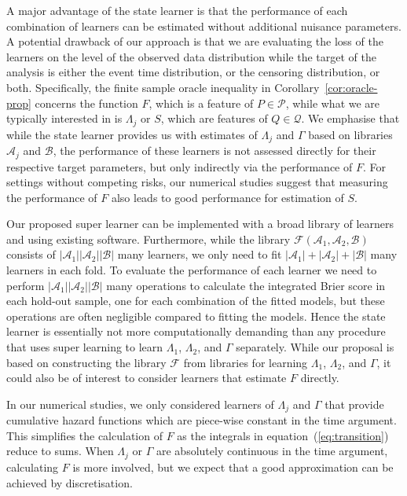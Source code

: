 \documentclass[11pt]{article}
\theoremstyle{thmstyleone}%
\theoremstyle{thmstyletwo}%
\theoremstyle{thmstylethree}%
\newcommand{\1}{\mathds{1}}
\begin{document}
A major advantage of the state learner is that the performance of each
combination of learners can be estimated without additional nuisance
parameters. A potential drawback of our approach is that we are
evaluating the loss of the learners on the level of the observed data
distribution while the target of the analysis is either the event time
distribution, or the censoring distribution, or both.
Specifically, the finite sample oracle inequality in
Corollary~\ref{cor:oracle-prop} concerns the function \( F \), which
is a feature of \( P \in \mathcal{P} \), while what we are typically
interested in is \( \Lambda_j \) or \( S \), which are features of
\( Q \in \mathcal{Q} \). We emphasise that while the state learner
provides us with estimates of \( \Lambda_j \) and $\Gamma$ based on
libraries \( \mathcal{A}_j \) and \( \mathcal{B} \), the performance
of these learners is not assessed directly for their respective target
parameters, but only indirectly via the performance of \( F \).  For
settings without competing risks, our numerical studies suggest that
measuring the performance of \( F \) also leads to good performance
for estimation of \( S \).

Our proposed super learner can be implemented with a broad library of learners
and using existing software.
Furthermore, while
the library \( \mathcal{F}(\mathcal{A}_1,\mathcal{A}_2,\mathcal{B}) \) consists
of \( |\mathcal{A}_1||\mathcal{A}_2||\mathcal{B}| \) many learners, we only need to fit
\( |\mathcal{A}_1| +|\mathcal{A}_2| + |\mathcal{B}| \) many learners in each fold. To
evaluate the performance of each learner we need to perform
\( |\mathcal{A}_1||\mathcal{A}_2||\mathcal{B}| \) many operations to calculate the
integrated Brier score in each hold-out sample, one for each combination of the
fitted models, but these operations are often negligible compared to fitting the
models. Hence the state learner is essentially not more computationally demanding
than any procedure that uses super learning to learn $\Lambda_1$, $\Lambda_2$,
and $\Gamma$ separately. While our proposal is based on constructing the library
\( \mathcal{F} \) from libraries for learning \( \Lambda_1 \), $\Lambda_2$, and
$\Gamma$, it could also be of interest to consider learners that estimate
\( F \) directly.

In our numerical studies, we only considered learners of $\Lambda_j$ and
$\Gamma$ that provide cumulative hazard functions which are piece-wise constant
in the time argument. This simplifies the calculation of \( F \) as the
integrals in equation~(\ref{eq:transition}) reduce to sums. When $\Lambda_j$ or
\( \Gamma \) are absolutely continuous in the time argument, calculating \( F \)
is more involved, but we expect that a good approximation can be achieved by
discretisation.
\end{document}
